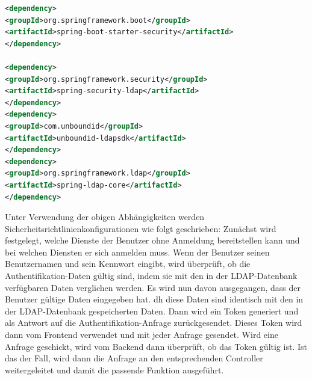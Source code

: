 \documentclass[a4paper,12pt,oneside]{book}
\begin{document}
\begin{lstlisting}[language=XML,caption=pom.xml - security dependencies]
<dependency>
<groupId>org.springframework.boot</groupId>
<artifactId>spring-boot-starter-security</artifactId>
</dependency>

<dependency>
<groupId>org.springframework.security</groupId>
<artifactId>spring-security-ldap</artifactId>
</dependency>
<dependency>
<groupId>com.unboundid</groupId>
<artifactId>unboundid-ldapsdk</artifactId>
</dependency>
<dependency>
<groupId>org.springframework.ldap</groupId>
<artifactId>spring-ldap-core</artifactId>
</dependency>
\end{lstlisting}
Unter Verwendung der obigen Abhängigkeiten werden Sicherheitsrichtlinienkonfigurationen wie folgt geschrieben: Zunächst wird festgelegt, welche Dienste der Benutzer ohne Anmeldung bereitstellen kann und bei welchen Diensten er sich anmelden muss. Wenn der Benutzer seinen Benutzernamen und sein Kennwort eingibt, wird überprüft, ob die Authentifikation-Daten gültig sind, indem sie mit den in der LDAP-Datenbank verfügbaren Daten verglichen werden.
\newline
Es wird nun davon ausgegangen, dass der Benutzer gültige Daten eingegeben hat. dh diese Daten sind identisch mit den in der LDAP-Datenbank gespeicherten Daten. Dann wird ein Token generiert und als Antwort auf die Authentifikation-Anfrage zurückgesendet. Dieses Token wird dann vom Frontend verwendet und mit jeder Anfrage gesendet.
\newline
Wird eine Anfrage geschickt, wird vom Backend dann überprüft, ob das Token gültig ist. Ist das der Fall, wird dann die Anfrage an den entsprechenden Controller weitergeleitet und damit die passende Funktion ausgeführt.
\end{document}
